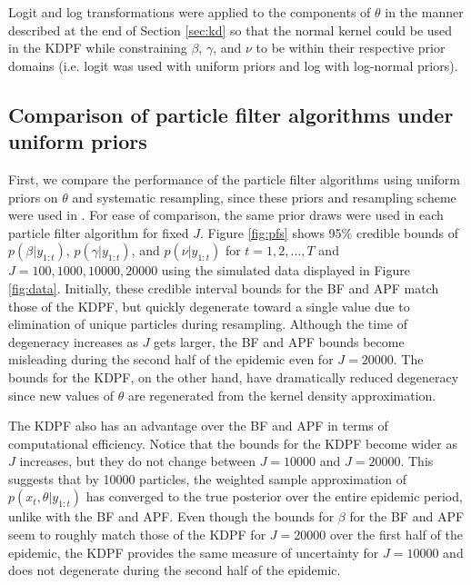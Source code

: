 \documentclass{elsarticle}
\begin{document}
Logit and log transformations were applied to the components of $\theta$ in the manner described at the end of Section \ref{sec:kd} so that the normal kernel could be used in the KDPF while constraining $\beta$, $\gamma$, and $\nu$ to be within their respective prior domains (i.e. logit was used with uniform priors and log with log-normal priors).

\subsection{Comparison of particle filter algorithms under uniform priors} \label{sec:pfcomparison}

First, we compare the performance of the particle filter algorithms using uniform priors on $\theta$ and systematic resampling, since these priors and resampling scheme were used in \citet{skvortsov2012monitoring}. For ease of comparison, the same prior draws were used in each particle filter algorithm for fixed $J$. Figure \ref{fig:pfs} shows 95\% credible bounds of $p(\beta|y_{1:t})$, $p(\gamma|y_{1:t})$, and $p(\nu|y_{1:t})$ for $t = 1,2,\ldots,T$ and $J = 100, 1000, 10000, 20000$ using the simulated data displayed in Figure \ref{fig:data}. Initially, these credible interval bounds for the BF and APF match those of the KDPF, but quickly degenerate toward a single value due to elimination of unique particles during resampling. Although the time of degeneracy increases as $J$ gets larger, the BF and APF bounds become misleading during the second half of the epidemic even for $J = 20000$. The bounds for the KDPF, on the other hand, have dramatically reduced degeneracy since new values of $\theta$ are regenerated from the kernel density approximation.

The KDPF also has an advantage over the BF and APF in terms of computational efficiency. Notice that the bounds for the KDPF become wider as $J$ increases, but they do not change between $J = 10000$ and $J = 20000$. This suggests that by 10000 particles, the weighted sample approximation of $p(x_t,\theta|y_{1:t})$ has converged to the true posterior over the entire epidemic period, unlike with the BF and APF. Even though the bounds for $\beta$ for the BF and APF seem to roughly match those of the KDPF for $J = 20000$ over the first half of the epidemic, the KDPF provides the same measure of uncertainty for $J = 10000$ and does not degenerate during the second half of the epidemic.
\end{document}
